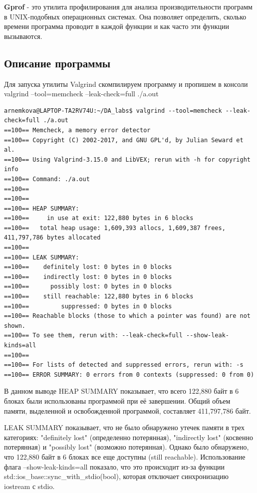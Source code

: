 \documentclass[12pt]{article}
\begin{document}
\textbf{Gprof} - это утилита профилирования для анализа производительности программ в UNIX-подобных операционных системах. Она позволяет определить, сколько времени программа проводит в каждой функции и как часто эти функции вызываются.


\subsection*{Описание программы}

Для запуска утилиты Valgrind скомпилируем программу и пропишем в консоли valgrind --tool=memcheck --leak-check=full ./a.out

\begin{small}
\footnotesize
\begin{verbatim}
arnemkova@LAPTOP-TA2RV74U:~/DA_labs$ valgrind --tool=memcheck --leak-check=full ./a.out
==100== Memcheck, a memory error detector
==100== Copyright (C) 2002-2017, and GNU GPL'd, by Julian Seward et al.
==100== Using Valgrind-3.15.0 and LibVEX; rerun with -h for copyright info
==100== Command: ./a.out
==100==
==100==
==100== HEAP SUMMARY:
==100==     in use at exit: 122,880 bytes in 6 blocks
==100==   total heap usage: 1,609,393 allocs, 1,609,387 frees, 411,797,786 bytes allocated
==100==
==100== LEAK SUMMARY:
==100==    definitely lost: 0 bytes in 0 blocks
==100==    indirectly lost: 0 bytes in 0 blocks
==100==      possibly lost: 0 bytes in 0 blocks
==100==    still reachable: 122,880 bytes in 6 blocks
==100==         suppressed: 0 bytes in 0 blocks
==100== Reachable blocks (those to which a pointer was found) are not shown.
==100== To see them, rerun with: --leak-check=full --show-leak-kinds=all
==100==
==100== For lists of detected and suppressed errors, rerun with: -s
==100== ERROR SUMMARY: 0 errors from 0 contexts (suppressed: 0 from 0)
\end{verbatim}
\end{small}

В данном выводе HEAP SUMMARY показывает, что всего 122,880 байт в 6 блоках были использованы программой при её завершении. Общий объем памяти, выделенной и освобожденной программой, составляет 411,797,786 байт.

LEAK SUMMARY показывает, что не было обнаружено утечек памяти в трех категориях: "definitely lost" (определенно потерянная), "indirectly lost" (косвенно потерянная) и "possibly lost" (возможно потерянная). Однако было обнаружено, что 122,880 байт в 6 блоках все еще доступны (still reachable). Использование флага --show-leak-kinds=all показало, что это происходит из-за функции std::ios{\_}base::sync{\_}with{\_}stdio(bool), которая отключает синхронизацию iostream с stdio.
\end{document}
